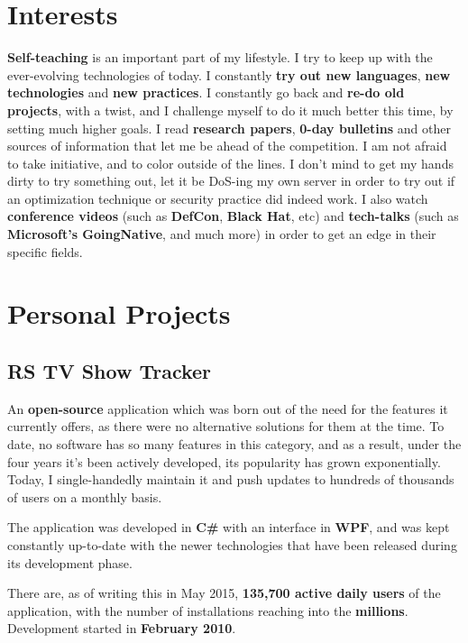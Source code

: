 \documentclass[11pt,a4paper,sans]{moderncv}
\begin{document}
\section{Interests}
	\textbf{Self-teaching} is an important part of my lifestyle. I try to keep up with the ever-evolving technologies of today. I constantly \textbf{try out new languages}, \textbf{new technologies} and \textbf{new practices}. I constantly go back and \textbf{re-do old projects}, with a twist, and I challenge myself to do it much better this time, by setting much higher goals. I read \textbf{research papers}, \textbf{0-day bulletins} and other sources of information that let me be ahead of the competition. I am not afraid to take initiative, and to color outside of the lines. I don't mind to get my hands dirty to try something out, let it be DoS-ing my own server in order to try out if an optimization technique or security practice did indeed work. I also watch \textbf{conference videos} (such as \textbf{DefCon}, \textbf{Black Hat}, etc) and \textbf{tech-talks} (such as \textbf{Microsoft's GoingNative}, and much more) in order to get an edge in their specific fields.

\section{Personal Projects}
	\subsection{RS TV Show Tracker}

		An \textbf{open-source} application which was born out of the need for the features it currently offers, as there were no alternative solutions for them at the time. To date, no software has so many features in this category, and as a result, under the four years it's been actively developed, its popularity has grown exponentially. Today, I single-handedly maintain it and push updates to hundreds of thousands of users on a monthly basis.
		
		The application was developed in \textbf{C\#} with an interface in \textbf{WPF}, and was kept constantly up-to-date with the newer technologies that have been released during its development phase.

		There are, as of writing this in May 2015, \textbf{135,700 active daily users} of the application, with the number of installations reaching into the \textbf{millions}. Development started in \textbf{February 2010}.
\end{document}
